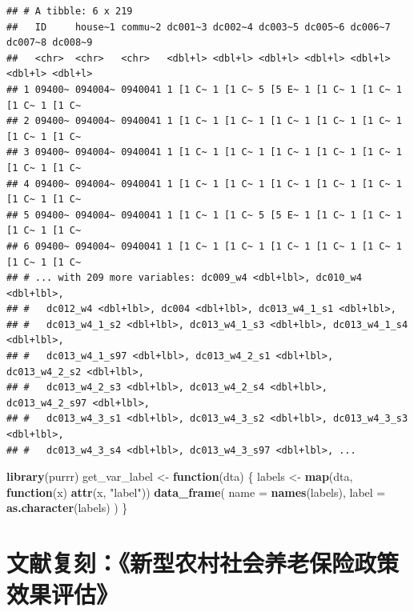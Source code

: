 \documentclass[
  oneside]{book}
\newenvironment{Shaded}{\begin{snugshade}}{\end{snugshade}}
\newcommand{\AttributeTok}[1]{\textcolor[rgb]{0.13,0.29,0.53}{#1}}
\newcommand{\ControlFlowTok}[1]{\textcolor[rgb]{0.13,0.29,0.53}{\textbf{#1}}}
\newcommand{\FunctionTok}[1]{\textcolor[rgb]{0.13,0.29,0.53}{\textbf{#1}}}
\newcommand{\NormalTok}[1]{#1}
\newcommand{\OtherTok}[1]{\textcolor[rgb]{0.56,0.35,0.01}{#1}}
\newcommand{\StringTok}[1]{\textcolor[rgb]{0.31,0.60,0.02}{#1}}
\begin{document}
\begin{verbatim}
## # A tibble: 6 x 219
##   ID     house~1 commu~2 dc001~3 dc002~4 dc003~5 dc005~6 dc006~7 dc007~8 dc008~9
##   <chr>  <chr>   <chr>   <dbl+l> <dbl+l> <dbl+l> <dbl+l> <dbl+l> <dbl+l> <dbl+l>
## 1 09400~ 094004~ 0940041 1 [1 C~ 1 [1 C~ 5 [5 E~ 1 [1 C~ 1 [1 C~ 1 [1 C~ 1 [1 C~
## 2 09400~ 094004~ 0940041 1 [1 C~ 1 [1 C~ 1 [1 C~ 1 [1 C~ 1 [1 C~ 1 [1 C~ 1 [1 C~
## 3 09400~ 094004~ 0940041 1 [1 C~ 1 [1 C~ 1 [1 C~ 1 [1 C~ 1 [1 C~ 1 [1 C~ 1 [1 C~
## 4 09400~ 094004~ 0940041 1 [1 C~ 1 [1 C~ 1 [1 C~ 1 [1 C~ 1 [1 C~ 1 [1 C~ 1 [1 C~
## 5 09400~ 094004~ 0940041 1 [1 C~ 1 [1 C~ 5 [5 E~ 1 [1 C~ 1 [1 C~ 1 [1 C~ 1 [1 C~
## 6 09400~ 094004~ 0940041 1 [1 C~ 1 [1 C~ 1 [1 C~ 1 [1 C~ 1 [1 C~ 1 [1 C~ 1 [1 C~
## # ... with 209 more variables: dc009_w4 <dbl+lbl>, dc010_w4 <dbl+lbl>,
## #   dc012_w4 <dbl+lbl>, dc004 <dbl+lbl>, dc013_w4_1_s1 <dbl+lbl>,
## #   dc013_w4_1_s2 <dbl+lbl>, dc013_w4_1_s3 <dbl+lbl>, dc013_w4_1_s4 <dbl+lbl>,
## #   dc013_w4_1_s97 <dbl+lbl>, dc013_w4_2_s1 <dbl+lbl>, dc013_w4_2_s2 <dbl+lbl>,
## #   dc013_w4_2_s3 <dbl+lbl>, dc013_w4_2_s4 <dbl+lbl>, dc013_w4_2_s97 <dbl+lbl>,
## #   dc013_w4_3_s1 <dbl+lbl>, dc013_w4_3_s2 <dbl+lbl>, dc013_w4_3_s3 <dbl+lbl>,
## #   dc013_w4_3_s4 <dbl+lbl>, dc013_w4_3_s97 <dbl+lbl>, ...
\end{verbatim}

\begin{Shaded}
\begin{Highlighting}[]
\FunctionTok{library}\NormalTok{(purrr)}
\NormalTok{get\_var\_label }\OtherTok{\textless{}{-}} \ControlFlowTok{function}\NormalTok{(dta) \{}
\NormalTok{  labels }\OtherTok{\textless{}{-}} \FunctionTok{map}\NormalTok{(dta, }\ControlFlowTok{function}\NormalTok{(x) }\FunctionTok{attr}\NormalTok{(x, }\StringTok{"label"}\NormalTok{))}
  \FunctionTok{data\_frame}\NormalTok{(}
    \AttributeTok{name =} \FunctionTok{names}\NormalTok{(labels),}
    \AttributeTok{label =} \FunctionTok{as.character}\NormalTok{(labels)}
\NormalTok{  )}
\NormalTok{\}}
\end{Highlighting}
\end{Shaded}

\hypertarget{ux6587ux732eux590dux523bux65b0ux578bux519cux6751ux793eux4f1aux517bux8001ux4fddux9669ux653fux7b56ux6548ux679cux8bc4ux4f30}{%
\chapter{文献复刻：《新型农村社会养老保险政策效果评估》}\label{ux6587ux732eux590dux523bux65b0ux578bux519cux6751ux793eux4f1aux517bux8001ux4fddux9669ux653fux7b56ux6548ux679cux8bc4ux4f30}}
\end{document}
